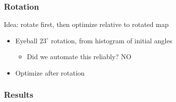 \documentclass[12pt,t,xcolor=dvipsnames]{beamer}
\begin{document}
\begin{frame}
  \frametitle{Rotation}

  Idea: rotate first, then optimize relative to rotated map
  \begin{itemize}
  \item Eyeball $23^\circ$ rotation, from histogram of initial angles
    \begin{itemize}
    \item Did we automate this reliably? NO
    \end{itemize}
  \item Optimize after rotation
  \end{itemize}

\end{frame}

\begin{frame}
  \frametitle{Results}


\end{frame}
\end{document}

